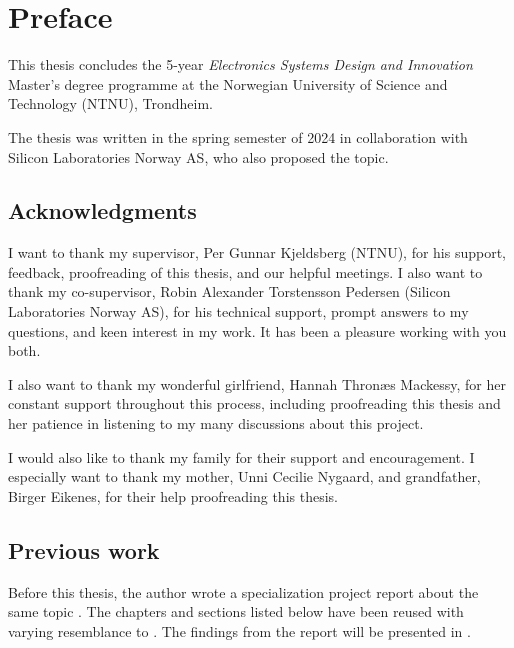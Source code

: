 \chapter*{Preface}


This thesis concludes the 5-year \textit{Electronics Systems Design and Innovation} Master's degree programme at the Norwegian University of Science and Technology (NTNU), Trondheim.  

The thesis was written in the spring semester of 2024 in collaboration with Silicon Laboratories Norway AS, who also proposed the topic.


\section*{Acknowledgments}


I want to thank my supervisor, Per Gunnar Kjeldsberg (NTNU), for his support, feedback, proofreading of this thesis, and our helpful meetings. I also want to thank my co-supervisor, Robin Alexander Torstensson Pedersen (Silicon Laboratories Norway AS), for his technical support, prompt answers to my questions, and keen interest in my work. It has been a pleasure working with you both.


I also want to thank my wonderful girlfriend, Hannah Thronæs Mackessy, for her constant support throughout this process, including proofreading this thesis and her patience in listening to my many discussions about this project.

I would also like to thank my family for their support and encouragement. I especially want to thank my mother, Unni Cecilie Nygaard, and grandfather, Birger Eikenes, for their help proofreading this thesis.


\section*{Previous work}

Before this thesis, the author wrote a specialization project report about the same topic \cite{torjenygaardeikenesDesigningRISCVReference2023}. The chapters and sections listed below have been reused with varying resemblance to \cite{torjenygaardeikenesDesigningRISCVReference2023}. The findings from the report will be presented in .


